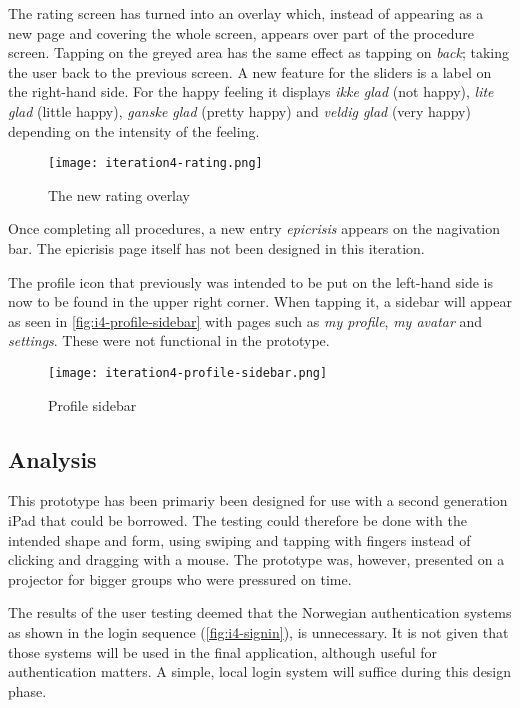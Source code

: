 The rating screen has turned into an overlay which, instead of appearing as a new page and covering the whole screen, appears over part of the procedure screen. Tapping on the greyed area has the same effect as tapping on \emph{back}; taking the user back to the previous screen. A new feature for the sliders is a label on the right-hand side. For the happy feeling it displays \emph{ikke glad} (not happy), \emph{lite glad} (little happy), \emph{ganske glad} (pretty happy) and \emph{veldig glad} (very happy) depending on the intensity of the feeling.

\begin{figure}
    \centering
    \texttt{[image: iteration4-rating.png]}
    \caption{The new rating overlay}
    \label{fig:i4-rating}
\end{figure}

Once completing all procedures, a new entry \emph{epicrisis} appears on the nagivation bar. The epicrisis page itself has not been designed in this iteration.

The profile icon that previously was intended to be put on the left-hand side is now to be found in the upper right corner.
When tapping it, a sidebar will appear as seen in \autoref{fig:i4-profile-sidebar} with pages such as \emph{my profile}, \emph{my avatar} and \emph{settings}. These were not functional in the prototype.

\begin{figure}
    \centering
    \texttt{[image: iteration4-profile-sidebar.png]}
    \caption{Profile sidebar}
    \label{fig:i4-profile-sidebar}
\end{figure}

\subsection{Analysis}

This prototype has been primariy been designed for use with a second generation iPad that could be borrowed. The testing could therefore be done with the intended shape and form, using swiping and tapping with fingers instead of clicking and dragging with a mouse. The prototype was, however, presented on a projector for bigger groups who were pressured on time.

The results of the user testing deemed that the Norwegian authentication systems as shown in the login sequence (\autoref{fig:i4-signin}), is unnecessary. It is not given that those systems will be used in the final application, although useful for authentication matters. A simple, local login system will suffice during this design phase.

